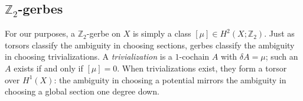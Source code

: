 \documentclass[11pt]{amsart}  %
\theoremstyle{plain}
\theoremstyle{definition}
\theoremstyle{remark}
\newcommand{\style}[1]{{\em #1}} %
\newcommand{\coboundary}{\delta} %
\newcommand{\Z}{\mathbb{Z}} %
\begin{document}
\subsection{$\Z_2$-gerbes}

For our purposes, a $\Z_2$-gerbe on $X$ is simply a class $[\mu] \in H^2(X; \Z_2)$. 
Just as torsors classify the ambiguity in choosing sections, gerbes classify the 
ambiguity in choosing trivializations. A 
\style{trivialization} is a $1$-cochain $A$ with $\coboundary A = \mu$; 
such an $A$ exists if and only if $[\mu] = 0$. When trivializations exist, 
they form a torsor over $H^1(X)$: the ambiguity in choosing a potential 
mirrors the ambiguity in choosing a global section one degree down.
\end{document}
